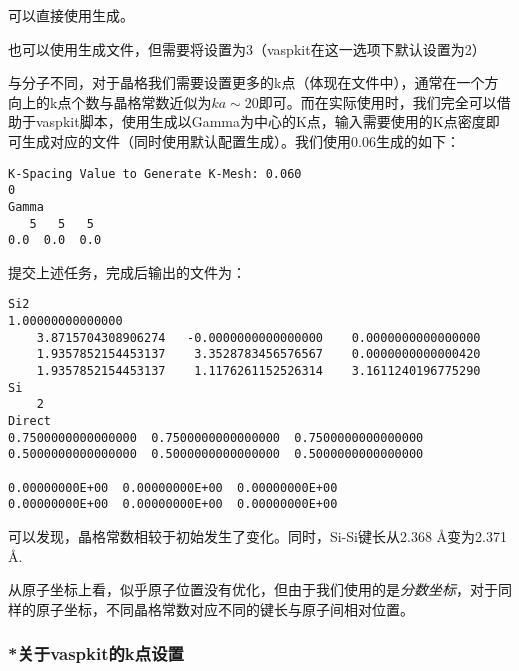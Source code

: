 可以直接使用生成。

\begin{attention}
    也可以使用生成文件，但需要将设置为3（vaspkit在这一选项下默认设置为2）
\end{attention}

与分子不同，对于晶格我们需要设置更多的k点（体现在文件中），通常在一个方向上的k点个数与晶格常数近似为$ka\sim20$即可。而在实际使用时，我们完全可以借助于vaspkit脚本，使用生成以Gamma为中心的K点，输入需要使用的K点密度即可生成对应的文件（同时使用默认配置生成）。我们使用0.06生成的如下：

\begin{lstlisting}[caption=KPOINTS]
K-Spacing Value to Generate K-Mesh: 0.060
0
Gamma
   5   5   5
0.0  0.0  0.0
\end{lstlisting}

提交上述任务，完成后输出的文件为：

\begin{lstlisting}[caption=CONTCAR]
Si2                                     
1.00000000000000     
    3.8715704308906274   -0.0000000000000000    0.0000000000000000
    1.9357852154453137    3.3528783456576567    0.0000000000000420
    1.9357852154453137    1.1176261152526314    3.1611240196775290
Si
    2
Direct
0.7500000000000000  0.7500000000000000  0.7500000000000000
0.5000000000000000  0.5000000000000000  0.5000000000000000

0.00000000E+00  0.00000000E+00  0.00000000E+00
0.00000000E+00  0.00000000E+00  0.00000000E+00
\end{lstlisting}

可以发现，晶格常数相较于初始发生了变化。同时，Si-Si键长从2.368 Å变为2.371 Å.

\begin{attention}
    从原子坐标上看，似乎原子位置没有优化，但由于我们使用的是\emph{分数坐标}，对于同样的原子坐标，不同晶格常数对应不同的键长与原子间相对位置。
\end{attention}

\subsubsection{*关于vaspkit的k点设置}

